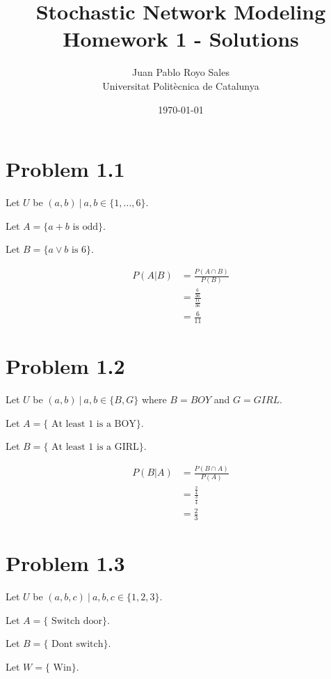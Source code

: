 \documentclass[12pt, a4paper]{article}
\title{%
  Stochastic Network Modeling \\
  Homework 1 - Solutions
}
\author{%
  Juan Pablo Royo Sales\\
  \small{Universitat Politècnica de Catalunya}
}
\date\today
\begin{document}
\maketitle

\section{Problem 1.1}

Let $U$ be $(a,b)\ |\ a,b \in \{1,\dots,6\}$.

Let $A = \{ a + b \text{ is odd}\}$.

Let $B = \{ a \lor b \text{ is 6}\}$.

\begin{subequations}
  \begin{align}
    P(A|B) &= \frac{P(A \cap B)}{P(B)}\\
           &= \frac{\frac{6}{36}}{\frac{11}{36}}\\
           &= \frac{6}{11}
  \end{align}
\end{subequations}

\section{Problem 1.2}
Let $U$ be $(a,b)\ |\ a,b \in \{B,G\}$ where $B = BOY$ and $G = GIRL$.

Let $A = \{ \text{ At least 1 is a BOY}\}$.

Let $B = \{ \text{ At least 1 is a GIRL}\}$.

\begin{subequations}
  \begin{align}
    P(B|A) &= \frac{P(B \cap A)}{P(A)}\\
           &= \frac{\frac{2}{4}}{\frac{3}{4}}\\
           &= \frac{2}{3}
  \end{align}
\end{subequations}

\section{Problem 1.3}
Let $U$ be $(a,b,c)\ |\ a,b,c \in \{1,2,3\}$.

Let $A = \{ \text{ Switch door}\}$.

Let $B = \{ \text{ Dont switch}\}$.

Let $W = \{ \text{ Win}\}$.
\end{document}
